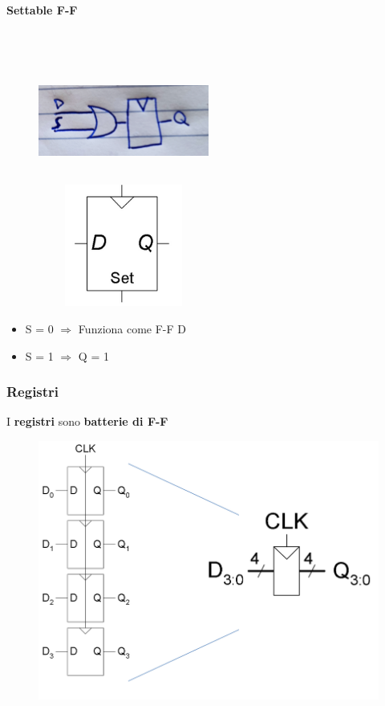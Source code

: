\documentclass{report}
\newcommand{\subsubsubsection}[1]{\paragraph{#1}\mbox{}\\}
\begin{document}
            \subsubsubsection{Settable F-F}
                \begin{center}
                    \begin{figure}[H]
                        \includegraphics[width=0.5\textwidth, height=4cm]{flipflops.jpg}
                        \includegraphics[width=0.5\textwidth, height=4cm]{flipflops2.png}
                    \end{figure}
                \end{center}
                \begin{itemize}
                    \item S = 0 $\Longrightarrow$ Funziona come F-F D
                    \item S = 1 $\Longrightarrow$ Q = 1
                \end{itemize}
        \subsubsection{Registri}
            I \textbf{registri} sono \textbf{batterie di F-F}
            \begin{center}
                \begin{figure}[H]
                    \includegraphics[width=\textwidth]{registri.png}
                \end{figure}
            \end{center}
\end{document}
